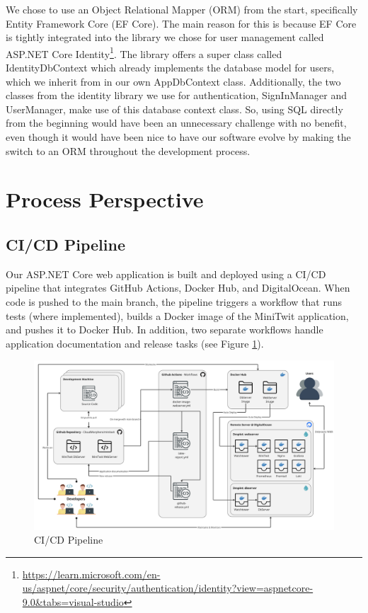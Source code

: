 \documentclass[12pt,a4paper,reqno]{report}
\begin{document}
We chose to use an Object Relational Mapper (ORM) from the start, specifically Entity Framework Core (EF Core). The main reason for this is because EF Core is tightly integrated into the library we chose for user management called ASP.NET Core Identity\footnote{\url{https://learn.microsoft.com/en-us/aspnet/core/security/authentication/identity?view=aspnetcore-9.0&tabs=visual-studio}}. The library offers a super class called IdentityDbContext which already implements the database model for users, which we inherit from in our own AppDbContext class. Additionally, the two classes from the identity library we use for authentication, SignInManager and UserManager, make use of this database context class. So, using SQL directly from the beginning would have been an unnecessary challenge with no benefit, even though it would have been nice to have our software evolve by making the switch to an ORM throughout the development process.

\section{Process Perspective}
\subsection{CI/CD Pipeline}

Our ASP.NET Core web application is built and deployed using a CI/CD pipeline that integrates GitHub Actions, Docker Hub, and DigitalOcean. When code is pushed to the main branch, the pipeline triggers a workflow that runs tests (where implemented), builds a Docker image of the MiniTwit application, and pushes it to Docker Hub. In addition, two separate workflows handle application documentation and release tasks (see Figure \ref{fig:CICD-diagram}).

\begin{figure}[h!]
    \centering
    \includegraphics[width=1.0\textwidth]{images/CI_CD.png}
    \caption{CI/CD Pipeline}
    \label{fig:CICD-diagram}
\end{figure}
\end{document}
